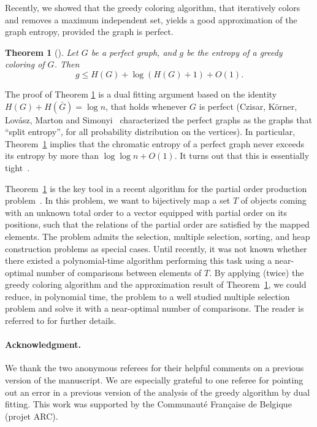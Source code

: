 \documentclass[10pt,a4paper]{article}
\newtheorem{theorem}{Theorem}
\begin{document}
Recently, we showed that the greedy coloring algorithm, that iteratively colors and removes a maximum independent set, yields a good approximation of the graph entropy, provided the graph is perfect.

\begin{theorem}[\cite{POP_SICOMP}]
\label{thm:colapxent}
Let $G$ be a perfect graph, and $g$ be the entropy of a greedy coloring of $G$. Then
$$
g \leq H(G) + \log (H(G) + 1) + O(1).
$$
\end{theorem}

The proof of Theorem \ref{thm:colapxent} is a dual fitting argument based on the identity $H(G) + H(\bar{G}) = \log n$, that holds whenever $G$ is perfect (Czisar, K\"orner, Lov\'asz, Marton and Simonyi~\cite{CKLMS90} characterized the perfect graphs as the graphs that ``split entropy'', for all probability distribution on the vertices). In particular, Theorem~\ref{thm:colapxent} implies that the chromatic entropy of a perfect graph never exceeds its entropy by more than $\log \log n + O(1)$. It turns out that this is essentially tight~\cite{POP_SICOMP}.\medskip

Theorem~\ref{thm:colapxent} is the key tool in a recent algorithm for the partial order production problem~\cite{POP_SICOMP}. In this problem, we want to bijectively map a set $T$ of objects coming with an unknown total order to a vector equipped with partial order on its positions, such that the relations of the partial order are satisfied by the mapped elements. The problem admits the selection, multiple selection, sorting, and heap construction problems as special cases. Until recently, it was not known whether there existed a polynomial-time algorithm performing this task using a near-optimal number of comparisons between elements of $T$. By applying (twice) the greedy coloring algorithm and the approximation result of Theorem~\ref{thm:colapxent}, we could reduce, in polynomial time, the problem to a well studied multiple selection problem and solve it with a near-optimal number of comparisons. The reader is referred to \cite{POP_SICOMP} for further details.

\paragraph{Acknowledgment.}
We thank the two anonymous referees for their helpful comments on a previous version of the manuscript.
We are especially grateful to one referee for pointing out an error in a previous
version of the analysis of the greedy algorithm by dual fitting.
This work was supported by the Communaut\'e Fran\c caise de Belgique (projet ARC).



\end{document}

